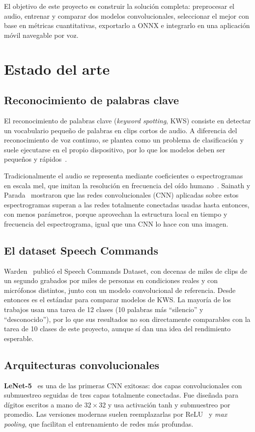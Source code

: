 \documentclass[conference]{IEEEtran}
\begin{document}
El objetivo de este proyecto es construir la solución completa: preprocesar el audio, entrenar y comparar dos modelos convolucionales, seleccionar el mejor con base en métricas cuantitativas, exportarlo a ONNX e integrarlo en una aplicación móvil navegable por voz.


\section{Estado del arte}
\subsection{Reconocimiento de palabras clave}
El reconocimiento de palabras clave (\textit{keyword spotting}, KWS) consiste en detectar un vocabulario pequeño de palabras en clips cortos de audio. A diferencia del reconocimiento de voz continuo, se plantea como un problema de clasificación y suele ejecutarse en el propio dispositivo, por lo que los modelos deben ser pequeños y rápidos~\cite{zhang2017}.

Tradicionalmente el audio se representa mediante coeficientes o espectrogramas en escala mel, que imitan la resolución en frecuencia del oído humano~\cite{davis1980}. Sainath y Parada~\cite{sainath2015} mostraron que las redes convolucionales (CNN) aplicadas sobre estos espectrogramas superan a las redes totalmente conectadas usadas hasta entonces, con menos parámetros, porque aprovechan la estructura local en tiempo y frecuencia del espectrograma, igual que una CNN lo hace con una imagen.

\subsection{El dataset Speech Commands}
Warden~\cite{warden2018} publicó el Speech Commands Dataset, con decenas de miles de clips de un segundo grabados por miles de personas en condiciones reales y con micrófonos distintos, junto con un modelo convolucional de referencia. Desde entonces es el estándar para comparar modelos de KWS. La mayoría de los trabajos usan una tarea de 12 clases (10 palabras más ``silencio'' y ``desconocido''), por lo que sus resultados no son directamente comparables con la tarea de 10 clases de este proyecto, aunque sí dan una idea del rendimiento esperable.

\subsection{Arquitecturas convolucionales}
\textbf{LeNet-5}~\cite{lecun1998} es una de las primeras CNN exitosas: dos capas convolucionales con submuestreo seguidas de tres capas totalmente conectadas. Fue diseñada para dígitos escritos a mano de $32\times32$ y usa activación tanh y submuestreo por promedio. Las versiones modernas suelen reemplazarlas por ReLU~\cite{nair2010} y \textit{max pooling}, que facilitan el entrenamiento de redes más profundas.
\end{document}
